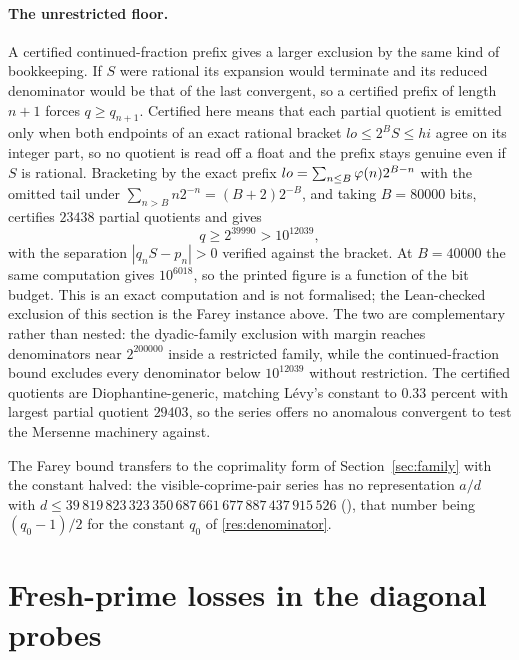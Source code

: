 \documentclass[11pt]{article}
\newcommand{\Stot}{S}
\begin{document}
\paragraph{The unrestricted floor.}
A certified continued-fraction prefix gives a larger exclusion by the same
kind of bookkeeping.  If $\Stot$ were rational its expansion would terminate
and its reduced denominator would be that of the last convergent, so a
certified prefix of length $n+1$ forces $q\ge q_{n+1}$.  Certified here means
that each partial quotient is emitted only when both endpoints of an exact
rational bracket $lo\le2^B\Stot\le hi$ agree on its integer part, so no
quotient is read off a float and the prefix stays genuine even if $\Stot$ is
rational.  Bracketing by the exact prefix
$lo=\sum_{n\le B}\varphi(n)2^{B-n}$ with the omitted tail under
$\sum_{n>B}n2^{-n}=(B+2)2^{-B}$, and taking $B=80000$ bits, certifies $23438$
partial quotients and gives
\[
  q\ge2^{39990}>10^{12039},
\]
with the separation $|q_n\Stot-p_n|>0$ verified against the bracket.  At
$B=40000$ the same computation gives $10^{6018}$, so the printed figure is a
function of the bit budget.  This is an exact computation and is not
formalised; the Lean-checked exclusion of this section is the Farey instance
above.  The two are complementary rather than nested: the dyadic-family
exclusion with margin reaches denominators near $2^{200000}$ inside a
restricted family, while the continued-fraction bound excludes every
denominator below $10^{12039}$ without restriction.  The certified quotients
are Diophantine-generic, matching L\'evy's constant to $0.33$ percent with
largest partial quotient $29403$, so the series offers no anomalous convergent
to test the Mersenne machinery against.

The Farey bound transfers to the coprimality form of Section~\ref{sec:family} with
the constant halved: the visible-coprime-pair series has no representation
$a/d$ with $d\le39\,819\,823\,323\,350\,687\,661\,677\,887\,437\,915\,526$
(),
that number being $(q_0-1)/2$ for the constant $q_0$ of
\ref{res:denominator}.

\section{Fresh-prime losses in the diagonal probes}\label{sec:fresh-prime}
\end{document}
